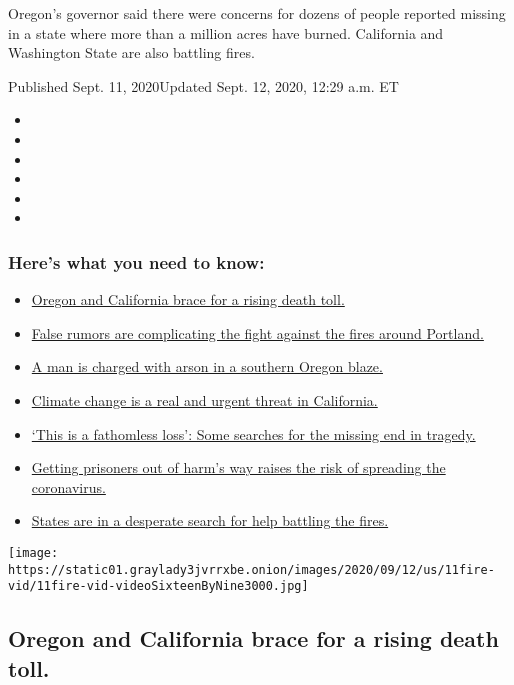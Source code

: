 Oregon's governor said there were concerns for dozens of people reported
missing in a state where more than a million acres have burned.
California and Washington State are also battling fires.

Published Sept. 11, 2020Updated Sept. 12, 2020, 12:29 a.m. ET

\begin{itemize}
\item
\item
\item
\item
\item
\item
\end{itemize}

\hypertarget{heres-what-you-need-to-know}{%
\subsubsection{Here's what you need to
know:}\label{heres-what-you-need-to-know}}

\begin{itemize}
\tightlist
\item
  \protect\hyperlink{link-1e628466}{Oregon and California brace for a
  rising death toll.}
\item
  \protect\hyperlink{link-7a0c7fbe}{False rumors are complicating the
  fight against the fires around Portland.}
\item
  \protect\hyperlink{link-18416023}{A man is charged with arson in a
  southern Oregon blaze.}
\item
  \protect\hyperlink{link-25b5d74}{Climate change is a real and urgent
  threat in California.}
\item
  \protect\hyperlink{link-5b86b2c4}{`This is a fathomless loss': Some
  searches for the missing end in tragedy.}
\item
  \protect\hyperlink{link-38ec109a}{Getting prisoners out of harm's way
  raises the risk of spreading the coronavirus.}
\item
  \protect\hyperlink{link-3e1cece7}{States are in a desperate search for
  help battling the fires.}
\end{itemize}

\texttt{[image: https://static01.graylady3jvrrxbe.onion/images/2020/09/12/us/11fire-vid/11fire-vid-videoSixteenByNine3000.jpg]}

\hypertarget{oregon-and-california-brace-for-a-rising-death-toll}{%
\subsection{Oregon and California brace for a rising death
toll.}\label{oregon-and-california-brace-for-a-rising-death-toll}}

